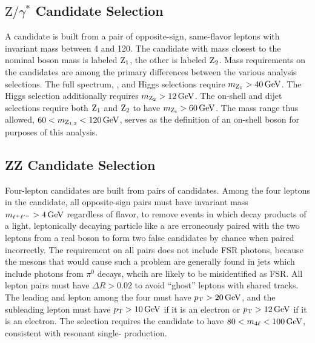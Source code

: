 \subsection{\texorpdfstring{$\text{Z}/\gamma^\ast$}{Z/gamma*} Candidate Selection}\label{sec:zSelection}

A {\Zgs} candidate is built from a pair of opposite-sign, same-flavor leptons with invariant mass between 4 and {120\GeV}.
The {\Zgs} candidate with mass closest to the nominal {\PZ} boson mass is labeled $\mathrm{Z}_1$, the other is labeled $\mathrm{Z}_2$.
Mass requirements on the {\Zgs} candidates are among the primary differences between the various analysis selections.
The full spectrum, {\Zfourl}, and Higgs selections require $m_{\mathrm{Z}_1} > 40\,\mathrm{Ge\hspace{-.08em}V}$.
The Higgs selection additionally requires $m_{\mathrm{Z}_2} > 12\,\mathrm{Ge\hspace{-.08em}V}$.
The on-shell and dijet selections require both $\mathrm{Z}_1$ and $\mathrm{Z}_2$ to have $m_{\mathrm{Z}_i} > 60\,\mathrm{Ge\hspace{-.08em}V}$.
The mass range thus allowed, $60 < m_{\mathrm{Z}_{1,2}} < 120\,\mathrm{Ge\hspace{-.08em}V}$, serves as the definition of an on-shell {\PZ} boson for purposes of this analysis.


\subsection{ZZ Candidate Selection}

Four-lepton candidates are built from pairs of {\Zgs} candidates.
Among the four leptons in the candidate, all opposite-sign pairs must have invariant mass $m_{\ell^+\ell^{\prime -}} > 4\,\mathrm{Ge\hspace{-.08em}V}$ regardless of flavor, to remove events in which decay products of a light, leptonically decaying particle like a {\PJpsi} are erroneously paired with the two leptons from a real {\PZ} boson to form two false {\Zgs} candidates by chance when paired incorrectly.
The requirement on all pairs does not include FSR photons, because the mesons that would cause such a problem are generally found in jets which include photons from $\pi^0$ decays, whcih are likely to be misidentified as FSR\@.
All lepton pairs must have $\Delta R > 0.02$ to avoid ``ghost'' leptons with shared tracks.
The leading and lepton among the four must have $p_\mathrm{T} > 20\,\mathrm{Ge\hspace{-.08em}V}$, and the subleading lepton must have $p_\mathrm{T} > 10\,\mathrm{Ge\hspace{-.08em}V}$ if it is an electron or $p_\mathrm{T} > 12\,\mathrm{Ge\hspace{-.08em}V}$ if it is an electron.
The {\Zfourl} selection requires the candidate to have $80 < m_{4\ell} < 100\,\mathrm{Ge\hspace{-.08em}V}$, consistent with resonant single-{\PZ} production.

